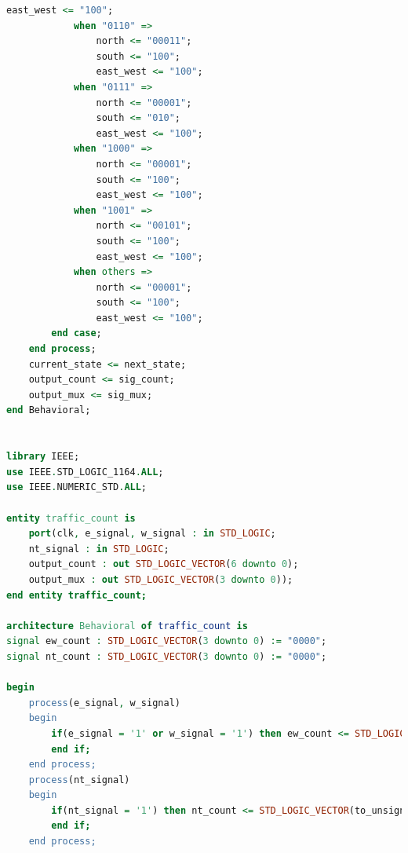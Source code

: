 \documentclass[11pt]{article}
\begin{document}
\begin{appendices}
\begin{lstlisting}[language=VHDL]
                east_west <= "100";
            when "0110" =>
                north <= "00011";
                south <= "100";
                east_west <= "100";
            when "0111" =>
                north <= "00001";
                south <= "010";
                east_west <= "100";
            when "1000" =>
                north <= "00001";
                south <= "100";
                east_west <= "100";
            when "1001" =>
                north <= "00101";
                south <= "100";
                east_west <= "100";
            when others =>
                north <= "00001";
                south <= "100";
                east_west <= "100";
        end case;
    end process;
    current_state <= next_state;
    output_count <= sig_count;
    output_mux <= sig_mux;
end Behavioral;


library IEEE;
use IEEE.STD_LOGIC_1164.ALL;
use IEEE.NUMERIC_STD.ALL;

entity traffic_count is
    port(clk, e_signal, w_signal : in STD_LOGIC;
    nt_signal : in STD_LOGIC;
    output_count : out STD_LOGIC_VECTOR(6 downto 0);
    output_mux : out STD_LOGIC_VECTOR(3 downto 0));
end entity traffic_count;

architecture Behavioral of traffic_count is
signal ew_count : STD_LOGIC_VECTOR(3 downto 0) := "0000";
signal nt_count : STD_LOGIC_VECTOR(3 downto 0) := "0000";

begin
    process(e_signal, w_signal)
    begin
        if(e_signal = '1' or w_signal = '1') then ew_count <= STD_LOGIC_VECTOR(to_unsigned(to_integer(unsigned(ew_count)) + 1, 4));
        end if;
    end process;
    process(nt_signal)
    begin
        if(nt_signal = '1') then nt_count <= STD_LOGIC_VECTOR(to_unsigned(to_integer(unsigned(ew_count)) + 1, 4));
        end if;
    end process;
    

\end{lstlisting}
\end{appendices}
\end{document}
